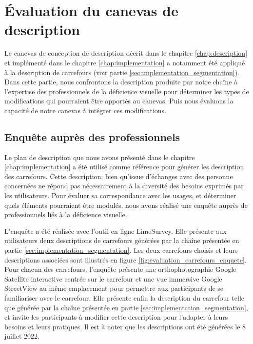 \section{Évaluation du canevas de description}

Le canevas de conception de description décrit dans le chapitre \ref{chap:description} et implémenté dans le chapitre \ref{chap:implementation} a notamment été appliqué à la description de carrefours (voir partie \ref{sec:implementation_segmentation}). Dans cette partie, nous confrontons la description produite par notre chaîne à l'expertise des professionnels de la déficience visuelle pour déterminer les types de modifications qui pourraient être apportés au canevas. Puis nous évaluons la capacité de notre canevas à intégrer ces modifications.

\subsection{Enquête auprès des professionnels}

Le plan de description que nous avons présenté dans le chapitre \ref{chap:implementation} a été utilisé comme référence pour générer les description des carrefours. Cette description, bien qu'issue d'échanges avec des personne concernées ne répond pas nécessairement à la diversité des besoins exprimés par les utilisateurs. Pour évaluer sa correspondance avec les usages, et déterminer quels éléments pourraient être modulés, nous avons réalisé une enquête auprès de professionnels liés à la déficience visuelle.

\newpar{}

L'enquête a été réalisée avec l'outil en ligne LimeSurvey. Elle présente aux utilisateurs deux descriptions de carrefours générées par la chaîne présentée en partie \ref{sec:implementation_segmentation}. Les deux carrefours choisis et leurs descriptions associées sont illustrés en figure \ref{fig:evaluation_carrefours_enquete}. Pour chacun des carrefours, l'enquête présente une orthophotographie Google Satellite interactive centrée sur le carrefour et une vue immersive Google StreetView au même emplacement pour permettre aux participants de se familiariser avec le carrefour. Elle présente enfin la description du carrefour telle que générée par la chaîne présentée en partie \ref{sec:implementation_segmentation}, et invite les participants à modifier cette description pour l'adapter à leurs besoins et leurs pratiques. Il est à noter que les descriptions ont été générées le 8 juillet 2022.


